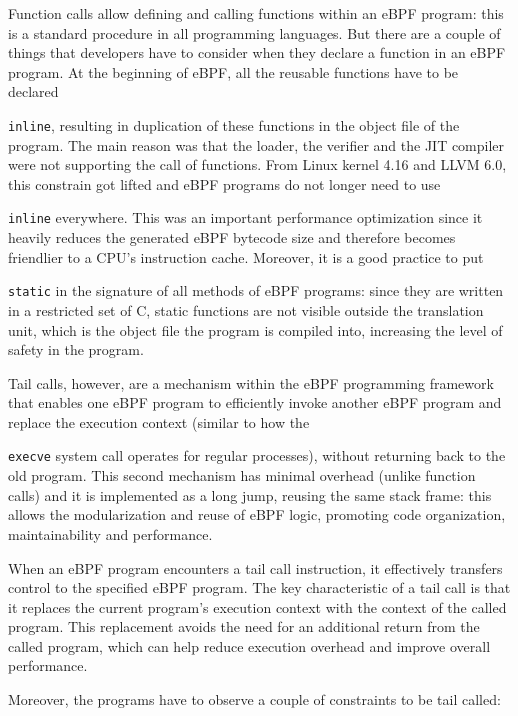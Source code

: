 Function calls allow defining and calling functions within an eBPF program: this is a standard procedure in all programming languages. 
But there are a couple of things that developers have to consider when they declare a function in an eBPF program.
At the beginning of eBPF, all the reusable functions have to be declared \raggedright\colorbox{backcolour}{\lstinline[style=commandline, language=bash]|inline|}, resulting in duplication of these functions in the object file of the program.
The main reason was that the loader, the verifier and the JIT compiler were not supporting the call of functions.
From Linux kernel 4.16 and LLVM 6.0, this constrain got lifted and eBPF programs do not longer need to use \raggedright\colorbox{backcolour}{\lstinline[style=commandline, language=bash]|inline|} everywhere.
This was an important performance optimization since it heavily reduces the generated eBPF bytecode size and therefore becomes friendlier to a CPU’s instruction cache.
Moreover, it is a good practice to put \raggedright\colorbox{backcolour}{\lstinline[style=commandline, language=bash]|static|} in the signature of all methods of eBPF programs: since they are written in a restricted set of C, static functions are not visible outside the translation unit, which is the object file the program is compiled into, increasing the level of safety in the program.

Tail calls, however, are a mechanism within the eBPF programming framework that enables one eBPF program to efficiently invoke another eBPF program and replace the execution context (similar to how the \raggedright\colorbox{backcolour}{\lstinline[style=commandline, language=bash]|execve|} system call operates for regular processes), without returning back to the old program.
This second mechanism has minimal overhead (unlike function calls) and it is implemented as a long jump, reusing the same stack frame: this allows the modularization and reuse of eBPF logic, promoting code organization, maintainability and performance.

When an eBPF program encounters a tail call instruction, it effectively transfers control to the specified eBPF program.
The key characteristic of a tail call is that it replaces the current program's execution context with the context of the called program. 
This replacement avoids the need for an additional return from the called program, which can help reduce execution overhead and improve overall performance.

Moreover, the programs have to observe a couple of constraints to be tail called:


